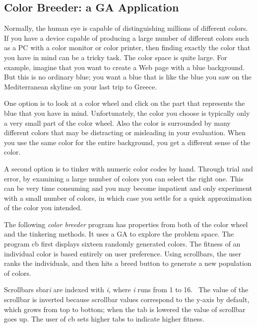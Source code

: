 \subsection{Color Breeder: a GA Application}

Normally, the human eye is capable of distinguishing millions of
different colors. If you have a device capable of producing a large
number of different colors such as a PC with a color monitor or color
printer, then finding exactly the color that you have in mind can be a
tricky task. The color space is quite large. For example, imagine that
you want to create a Web page with a blue background. But this is no
ordinary blue; you want a blue that is like the blue you saw on the
Mediterranean skyline on your last trip to Greece. \ 

One option is to look at a color wheel and click on the part that
represents the blue that you have in mind. Unfortunately,
the color you choose is typically only a very small part of the
color wheel. Also the color is surrounded by many different colors that
may be distracting or misleading in your evaluation. When you use the
same color for the entire background, you get a different sense of the
color. 

A second option is to tinker with numeric color codes by hand. Through
trial and error, by examining a large number of colors you can select
the right one. This can be very time consuming and you may become
impatient and only experiment with a small number of colors, in which
case you settle for a quick approximation of the color you intended.

The following \textit{color breeder} program has properties from both of
the color wheel and the tinkering methods. It uses a GA to explore the
problem space. The program \textsf{cb} first displays sixteen randomly
generated colors. The fitness of an individual color is based entirely
on user preference. Using scrollbars, the user ranks the individuals,
and then hits a breed button to generate a new population of colors. 

Scrollbars \textsf{sbar}\textsf{\textit{i}} are indexed with
\textsf{\textit{i}}\textit{,} where \textsf{\textit{i}} runs from 1 to
16. \ The value of the scrollbar is inverted because scrollbar values
correspond to the y-axis by default, which grows from top to bottom;
when the tab is lowered the value of scrollbar goes up. The user of
\textsf{cb} sets higher tabs to indicate higher fitness.


